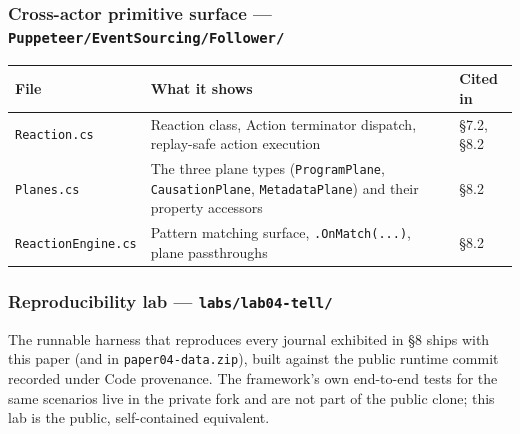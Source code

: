 \documentclass[
]{article}
\newcounter{none} %
\let\origtexttt\texttt%
\renewcommand{\texttt}[1]{\origtexttt{\seqsplit{#1}}}%
\let\texttt\origtexttt%
\begin{document}
\subsubsection{\texorpdfstring{Cross-actor primitive surface ---
\texttt{Puppeteer/EventSourcing/Follower/}}{Cross-actor primitive surface --- Puppeteer/EventSourcing/Follower/}}\label{cross-actor-primitive-surface-puppeteereventsourcingfollower}

{\def\LTcaptype{none} %
\begin{longtable}[]{@{}
  >{\raggedright\arraybackslash}p{}
  >{\raggedright\arraybackslash}p{}
  >{\raggedright\arraybackslash}p{}@{}}
\toprule\noalign{}
\begin{minipage}[b]{\linewidth}\raggedright
File
\end{minipage} & \begin{minipage}[b]{\linewidth}\raggedright
What it shows
\end{minipage} & \begin{minipage}[b]{\linewidth}\raggedright
Cited in
\end{minipage} \\
\midrule\noalign{}
\endhead
\bottomrule\noalign{}
\endlastfoot
\texttt{Reaction.cs} & Reaction class, Action terminator dispatch,
replay-safe action execution & §7.2, §8.2 \\
\texttt{Planes.cs} & The three plane types (\texttt{ProgramPlane},
\texttt{CausationPlane}, \texttt{MetadataPlane}) and their property
accessors & §8.2 \\
\texttt{ReactionEngine.cs} & Pattern matching surface,
\texttt{.OnMatch(...)}, plane passthroughs & §8.2 \\
\end{longtable}
}

\subsubsection{\texorpdfstring{Reproducibility lab ---
\texttt{labs/lab04-tell/}}{Reproducibility lab --- labs/lab04-tell/}}\label{reproducibility-lab-labslab04-tell}

The runnable harness that reproduces every journal exhibited in §8 ships
with this paper (and in \texttt{paper04-data.zip}), built against the
public runtime commit recorded under Code provenance. The framework's
own end-to-end tests for the same scenarios live in the private fork and
are not part of the public clone; this lab is the public, self-contained
equivalent.
\end{document}
